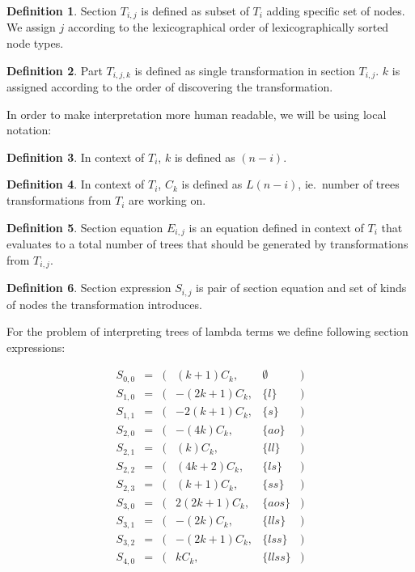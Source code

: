 \documentclass[final]{article}
\theoremstyle{definition}
\newtheorem{definition}{Definition}[subsection]
\theoremstyle{remark}
\begin{document}
\begin{definition}
    Section \(T_{i,j}\) is defined as subset of \(T_i\) adding specific set of nodes. We assign \(j\) according to the lexicographical order of lexicographically sorted node types.
\end{definition}

\begin{definition}
    Part \(T_{i,j,k}\) is defined as single transformation in section \(T_{i,j}\). \(k\) is assigned according to the order of discovering the transformation.
\end{definition}

In order to make interpretation more human readable, we will be using local notation:

\begin{definition}
    In context of \(T_i\), \(k\) is defined as \((n - i)\).
\end{definition}

\begin{definition}
    In context of \(T_i\), \(C_k\) is defined as \(L(n - i)\), ie.\ number of trees transformations from \(T_i\) are working on.
\end{definition}

\begin{definition}
    Section equation \(E_{i, j}\) is an equation defined in context of \(T_i\) that evaluates to a total number of trees that should be generated by transformations from \(T_{i, j}\).
\end{definition}

\begin{definition}
    Section expression \(S_{i, j}\) is pair of section equation and set of kinds of nodes the transformation introduces.
\end{definition}

For the problem of interpreting trees of lambda terms we define following section expressions:

\[\begin{array}{rccrlc}
        S_{0,0} &=& (& (k + 1) C_k,& \emptyset &)\\
        S_{1,0} &=& (& - (2 k + 1) C_k,& \{l\} &)\\
        S_{1,1} &=& (& - 2 (k + 1) C_k,& \{s\} &)\\
        S_{2,0} &=& (& - (4 k) C_k,& \{ao\} &)\\
        S_{2,1} &=& (& (k) C_k,& \{ll\} &)\\
        S_{2,2} &=& (& (4 k + 2) C_k,& \{ls\} &)\\
        S_{2,3} &=& (& (k + 1) C_k,& \{ss\} &)\\
        S_{3,0} &=& (& 2 (2 k + 1) C_k,& \{aos\} &)\\
        S_{3,1} &=& (& - (2 k) C_k,& \{lls\} &)\\
        S_{3,2} &=& (& - (2 k + 1) C_k,& \{lss\} &)\\
        S_{4,0} &=& (& k C_k,& \{llss\} &)\\
\end{array}\]
\end{document}

